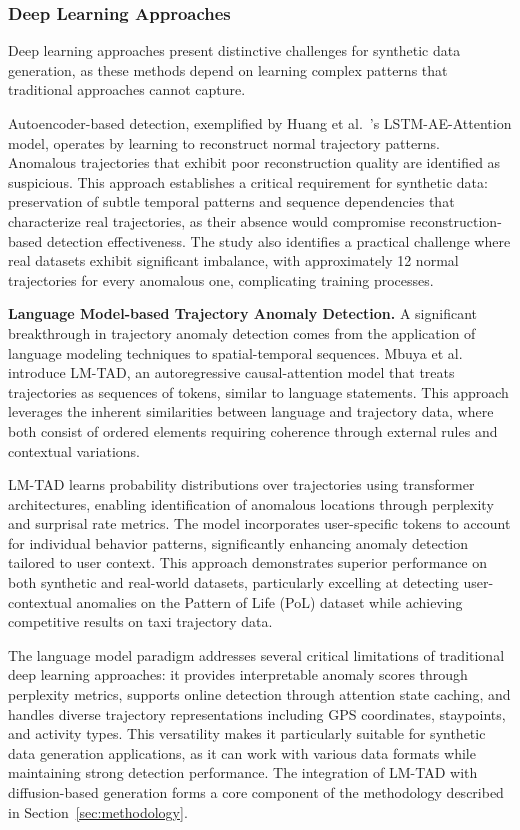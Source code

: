\subsubsection{Deep Learning Approaches}
\label{sec:deep-learning}

Deep learning approaches present distinctive challenges for synthetic data generation, as these methods depend on learning complex patterns that traditional approaches cannot capture.

Autoencoder-based detection, exemplified by Huang et al.~\cite{huangLSTMAutoencodersAttention2021}'s LSTM-AE-Attention model, operates by learning to reconstruct normal trajectory patterns. Anomalous trajectories that exhibit poor reconstruction quality are identified as suspicious. This approach establishes a critical requirement for synthetic data: preservation of subtle temporal patterns and sequence dependencies that characterize real trajectories, as their absence would compromise reconstruction-based detection effectiveness. The study also identifies a practical challenge where real datasets exhibit significant imbalance, with approximately 12 normal trajectories for every anomalous one, complicating training processes.

\textbf{Language Model-based Trajectory Anomaly Detection.} A significant breakthrough in trajectory anomaly detection comes from the application of language modeling techniques to spatial-temporal sequences. Mbuya et al.~\cite{mbuyaTrajectoryAnomalyDetection2024} introduce LM-TAD, an autoregressive causal-attention model that treats trajectories as sequences of tokens, similar to language statements. This approach leverages the inherent similarities between language and trajectory data, where both consist of ordered elements requiring coherence through external rules and contextual variations.

LM-TAD learns probability distributions over trajectories using transformer architectures, enabling identification of anomalous locations through perplexity and surprisal rate metrics. The model incorporates user-specific tokens to account for individual behavior patterns, significantly enhancing anomaly detection tailored to user context. This approach demonstrates superior performance on both synthetic and real-world datasets, particularly excelling at detecting user-contextual anomalies on the Pattern of Life (PoL) dataset while achieving competitive results on taxi trajectory data.

The language model paradigm addresses several critical limitations of traditional deep learning approaches: it provides interpretable anomaly scores through perplexity metrics, supports online detection through attention state caching, and handles diverse trajectory representations including GPS coordinates, staypoints, and activity types. This versatility makes it particularly suitable for synthetic data generation applications, as it can work with various data formats while maintaining strong detection performance. The integration of LM-TAD with diffusion-based generation forms a core component of the methodology described in Section~\ref{sec:methodology}.

